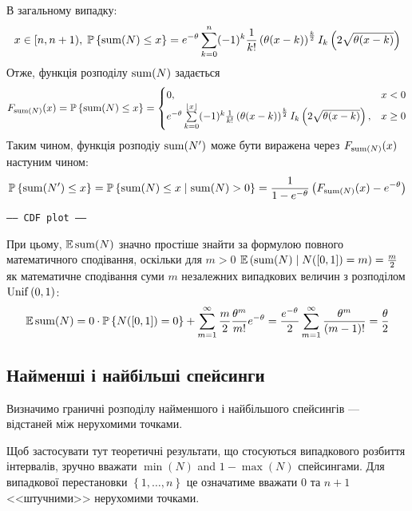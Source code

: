 В загальному випадку:
\begin{gather*}
    x \in [n, n+1), \;
    \P{\Sum(N) \leq x} = 
    e^{-\theta}
    \sum_{k=0}^{n}
    (-1)^k \frac{1}{k!} \left(\theta(x-k)\right)^{\frac{k}{2}} I_k\left(2\sqrt{\theta(x-k)}\right)
\end{gather*}
Отже, функція розподілу $\Sum(N)$ задається
\begin{equation}
    F_{\Sum(N)}(x) = \P{\Sum(N) \leq x} = \begin{cases}
        0, & x < 0 \\
        e^{-\theta}
        \sum\limits_{k=0}^{\floor*{x}}
        (-1)^k \frac{1}{k!}\left(\theta(x-k)\right)^{\frac{k}{2}} I_k\left(2\sqrt{\theta(x-k)}\right), & x \geq 0
    \end{cases}
\end{equation}
Таким чином, функція розподіу $\Sum(N')$ 
може бути виражена через $F_{\Sum(N)}(x)$ настуним чином:
\begin{equation}
    \P{\Sum(N') \leq x} = \P{\Sum(N) \leq x \mid \Sum(N) > 0} = \frac{1}{1-e^{-\theta}} \left(F_{\Sum(N)}(x) - e^{-\theta}\right)
\end{equation}
\begin{center}
    \texttt{----- CDF plot -----}
\end{center}

При цьому, $\E\Sum(N)$ значно простіше знайти
за формулою повного математичного сподівання,
оскільки для $m > 0$ $\E\left(\Sum(N) \mid N([0, 1]) = m\right) = \frac{m}{2}$
як математичне сподівання суми $m$ незалежних випадкових величин
з розподілом $\Unif{0, 1}$:
\begin{gather*}
    \E\Sum(N) = 0\cdot \P{N([0, 1]) = 0} +
    \sum_{m=1}^{\infty} \frac{m}{2} \frac{\theta^m}{m!} e^{-\theta} =
    \frac{e^{-\theta}}{2}\sum_{m=1}^{\infty} \frac{\theta^m}{(m-1)!} = \frac{\theta}{2}
\end{gather*}

\subsection{Найменші і найбільші спейсинги}
Визначимо граничні розподілу найменшого і найбільшого спейсингів --- відстаней
між нерухомими точками.
\begin{remark}
    Щоб застосувати тут теоретичні результати, що стосуються
    випадкового розбиття інтервалів, зручно вважати
    $\min(N)$ and $1-\max(N)$ спейсингами. Для випадкової
    перестановки $\left\{1, \dots, n\right\}$ це означатиме
    вважати $0$ та $n+1$ <<штучними>> нерухомими точками.
\end{remark}

